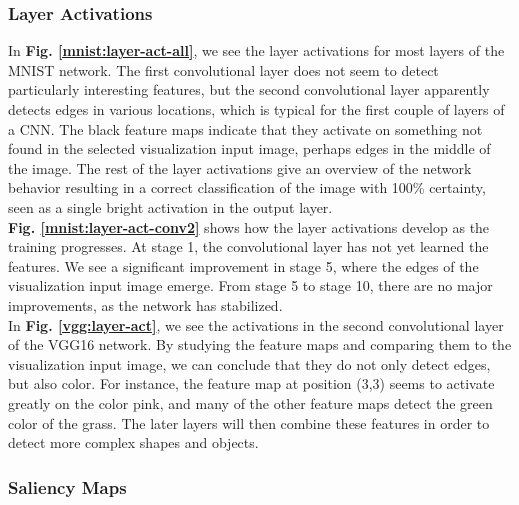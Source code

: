 \subsubsection{Layer Activations}

In \textbf{Fig. \ref{mnist:layer-act-all}}, we see the layer activations for most layers of the MNIST network. The first convolutional layer does not seem to detect particularly interesting features, but the second convolutional layer apparently detects edges in various locations, which is typical for the first couple of layers of a CNN. The black feature maps indicate that they activate on something not found in the selected visualization input image, perhaps edges in the middle of the image. The rest of the layer activations give an overview of the network behavior resulting in a correct classification of the image with 100\% certainty, seen as a single bright activation in the output layer. \\

\noindent \textbf{Fig. \ref{mnist:layer-act-conv2}} shows how the layer activations develop as the training progresses. At stage 1, the convolutional layer has not yet learned the features. We see a significant improvement in stage 5, where the edges of the visualization input image emerge. From stage 5 to stage 10, there are no major improvements, as the network has stabilized. \\

\noindent In \textbf{Fig. \ref{vgg:layer-act}}, we see the activations in the second convolutional layer of the VGG16 network. By studying the feature maps and comparing them to the visualization input image, we can conclude that they do not only detect edges, but also color. For instance, the feature map at position (3,3) seems to activate greatly on the color pink, and many of the other feature maps detect the green color of the grass. The later layers will then combine these features in order to detect more complex shapes and objects.


\subsubsection{Saliency Maps}

